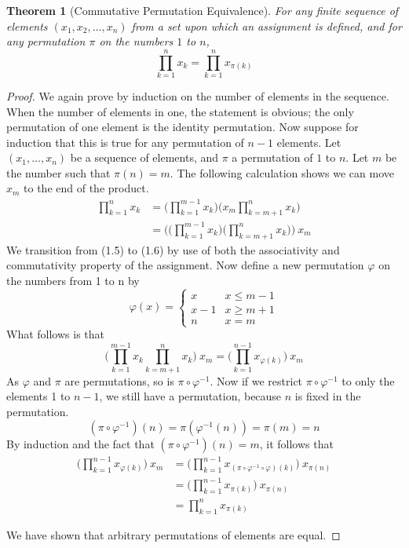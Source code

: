 \documentclass[12pt]{report}
\newtheorem{theorem}{Theorem}[section]
\begin{document}
\begin{theorem}[Commutative Permutation Equivalence]
    For any finite sequence of elements $(x_1, x_2, \dots, x_n)$ from a set upon which an assignment is defined, and for any permutation $\pi$ on the numbers $1$ to $n$,
    \[ \prod_{k=1}^n x_k = \prod_{k=1}^n x_{\pi(k)} \]
\end{theorem}
\begin{proof}
    We again prove by induction on the number of elements in the sequence. When the number of elements in one, the statement is obvious; the only permutation of one element is the identity permutation. Now suppose for induction that this is true for any permutation of $n-1$ elements. Let $(x_1, \dots, x_n)$ be a sequence of elements, and $\pi$ a permutation of $1$ to $n$. Let $m$ be the number such that $\pi(n) = m$. The following calculation shows we can move $x_m$ to the end of the product.
    \begin{align}
    \prod_{k=1}^n x_k &= \big( \prod_{k=1}^{m-1} x_k \big) \big( x_m \prod_{k=m+1}^n x_k \big)\\
    &= \Big( \big( \prod_{k=1}^{m-1} x_k \big) \big( \prod_{k=m+1}^n x_k \big) \Big)\ x_m
    \end{align}
    We transition from (1.5) to (1.6) by use of both the associativity and commutativity property of the assignment. Now define a new permutation $\varphi$ on the numbers from 1 to n by
    \[ \varphi(x) = \begin{cases} x   & x \leq m - 1\\
                               x-1 & x \geq m + 1\\
                               n   & x = m \end{cases} \]
    What follows is that
    \[ \big( \prod_{k=1}^{m-1} x_k \prod_{k=m+1}^n x_k \big)\ x_m = \big( \prod_{k=1}^{n-1} x_{\varphi(k)} \big)\ x_{m} \]
    As $\varphi$ and $\pi$ are permutations, so is $\pi \circ \varphi^{-1}$. Now if we restrict $\pi \circ \varphi^{-1}$ to only the elements 1 to $n-1$, we still have a permutation, because $n$ is fixed in the permutation.
    \[(\pi \circ \varphi^{-1})(n) = \pi(\varphi^{-1}(n)) = \pi(m) = n \]
    By induction and the fact that $(\pi \circ \varphi^{-1})(n) = m$, it follows that
    \begin{align}
        \big( \prod_{k=1}^{n-1} x_{\varphi(k)} \big)\ x_m &= \big( \prod_{k=1}^{n-1} x_{(\pi \circ \varphi^{-1} \circ \varphi)(k)} \big)\ x_{\pi(n)}\\
        &= \big( \prod_{k=1}^{n-1} x_{\pi(k)} \big)\ x_{\pi(n)}\\
        &= \prod_{k=1}^n x_{\pi(k)}
    \end{align}

    We have shown that arbitrary permutations of elements are equal.
\end{proof}
\end{document}
